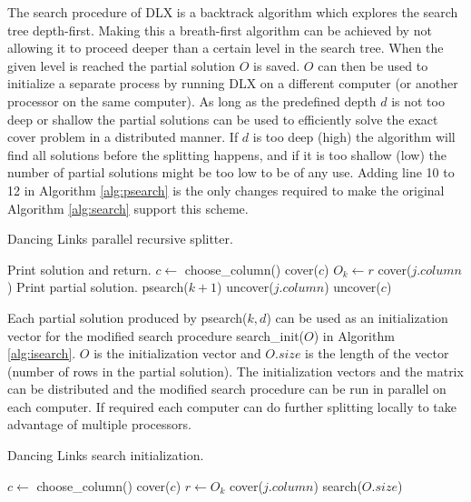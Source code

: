 The search procedure of DLX is a backtrack algorithm which explores the search tree depth-first.
Making this a breath-first algorithm can be achieved by not allowing it to proceed deeper than a certain level in the search tree.
When the given level is reached the partial solution $O$ is saved.
$O$ can then be used to initialize a separate process by running DLX on a different computer (or another processor on the same computer).
As long as the predefined depth $d$ is not too deep or shallow the partial solutions can be used to efficiently solve the exact cover problem in a distributed manner.
If $d$ is too deep (high) the algorithm will find all solutions before the splitting happens, and if it is too shallow (low) the number of partial solutions might be too low to be of any use.
Adding line 10 to 12 in Algorithm \ref{alg:psearch} is the only changes required to make the original Algorithm \ref{alg:search} support this scheme.
\begin{algorithm}[htbp]
	\caption{Dancing Links parallel recursive splitter.}
	\label{alg:psearch}
	\begin{distribalgo}[1]
				\STATE Print solution and return.  
			\ENDIF
			\STATE $c \leftarrow$ choose\_column()
			\STATE cover($c$)
				\STATE $O_k \leftarrow r$  
					\STATE cover($j.column$)
				\ENDFOR
					\STATE Print partial solution.  
				\ELSE
					\STATE psearch($k + 1$)
				\ENDIF
					\STATE uncover($j.column$)
				\ENDFOR
			\ENDFOR
			\STATE uncover($c$)
		\ENDPROC
	\end{distribalgo}
\end{algorithm}

Each partial solution produced by psearch($k, d$) can be used as an initialization vector for the modified search procedure search\_init($O$) in Algorithm \ref{alg:isearch}.
$O$ is the initialization vector and $O.size$ is the length of the vector (number of rows in the partial solution).
The initialization vectors and the matrix can be distributed and the modified search procedure can be run in parallel on each computer.
If required each computer can do further splitting locally to take advantage of multiple processors.
\begin{algorithm}[htbp]
	\caption{Dancing Links search initialization.}
	\label{alg:isearch}
	\begin{distribalgo}[1]
				\STATE $c \leftarrow$ choose\_column()
				\STATE cover($c$)
				\STATE $r \leftarrow O_k$
					\STATE cover($j.column$)
				\ENDFOR
			\ENDFOR
			\STATE search($O.size$)  
		\ENDPROC
	\end{distribalgo}
\end{algorithm}

